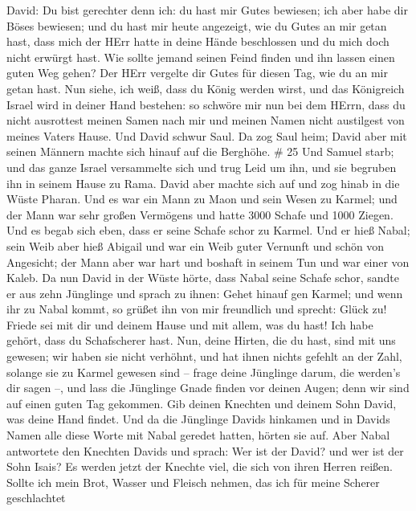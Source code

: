 David: Du bist gerechter denn ich: du hast mir Gutes bewiesen; ich aber
habe dir Böses bewiesen;  und du hast mir heute angezeigt,
wie du Gutes an mir getan hast, dass mich der HErr hatte in deine Hände
beschlossen und du mich doch nicht erwürgt hast.  Wie
sollte jemand seinen Feind finden und ihn lassen einen guten Weg gehen?
Der HErr vergelte dir Gutes für diesen Tag, wie du an mir getan hast.
 Nun siehe, ich weiß, dass du König werden wirst, und das
Königreich Israel wird in deiner Hand bestehen:  so schwöre
mir nun bei dem HErrn, dass du nicht ausrottest meinen Samen nach mir
und meinen Namen nicht austilgest von meines Vaters Hause. 
Und David schwur Saul. Da zog Saul heim; David aber mit seinen Männern
machte sich hinauf auf die Berghöhe. \# 25  Und Samuel
starb; und das ganze Israel versammelte sich und trug Leid um ihn, und
sie begruben ihn in seinem Hause zu Rama. David aber machte sich auf und
zog hinab in die Wüste Pharan.  Und es war ein Mann zu Maon
und sein Wesen zu Karmel; und der Mann war sehr großen Vermögens und
hatte 3000 Schafe und 1000 Ziegen. Und es begab sich eben, dass er seine
Schafe schor zu Karmel.  Und er hieß Nabal; sein Weib aber
hieß Abigail und war ein Weib guter Vernunft und schön von Angesicht;
der Mann aber war hart und boshaft in seinem Tun und war einer von
Kaleb.  Da nun David in der Wüste hörte, dass Nabal seine
Schafe schor,  sandte er aus zehn Jünglinge und sprach zu
ihnen: Gehet hinauf gen Karmel; und wenn ihr zu Nabal kommt, so grüßet
ihn von mir freundlich  und sprecht: Glück zu! Friede sei
mit dir und deinem Hause und mit allem, was du hast!  Ich
habe gehört, dass du Schafscherer hast. Nun, deine Hirten, die du hast,
sind mit uns gewesen; wir haben sie nicht verhöhnt, und hat ihnen nichts
gefehlt an der Zahl, solange sie zu Karmel gewesen sind -- 
frage deine Jünglinge darum, die werden's dir sagen --, und lass die
Jünglinge Gnade finden vor deinen Augen; denn wir sind auf einen guten
Tag gekommen. Gib deinen Knechten und deinem Sohn David, was deine Hand
findet.  Und da die Jünglinge Davids hinkamen und in Davids
Namen alle diese Worte mit Nabal geredet hatten, hörten sie auf.
 Aber Nabal antwortete den Knechten Davids und sprach: Wer
ist der David? und wer ist der Sohn Isais? Es werden jetzt der Knechte
viel, die sich von ihren Herren reißen.  Sollte ich mein
Brot, Wasser und Fleisch nehmen, das ich für meine Scherer geschlachtet
